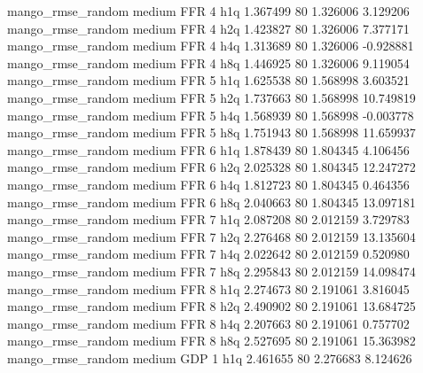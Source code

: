 mango_rmse_random     medium      FFR                 4                  h1q  1.367499 80       1.326006           3.129206
mango_rmse_random     medium      FFR                 4                  h2q  1.423827 80       1.326006           7.377171
mango_rmse_random     medium      FFR                 4                  h4q  1.313689 80       1.326006          -0.928881
mango_rmse_random     medium      FFR                 4                  h8q  1.446925 80       1.326006           9.119054
mango_rmse_random     medium      FFR                 5                  h1q  1.625538 80       1.568998           3.603521
mango_rmse_random     medium      FFR                 5                  h2q  1.737663 80       1.568998          10.749819
mango_rmse_random     medium      FFR                 5                  h4q  1.568939 80       1.568998          -0.003778
mango_rmse_random     medium      FFR                 5                  h8q  1.751943 80       1.568998          11.659937
mango_rmse_random     medium      FFR                 6                  h1q  1.878439 80       1.804345           4.106456
mango_rmse_random     medium      FFR                 6                  h2q  2.025328 80       1.804345          12.247272
mango_rmse_random     medium      FFR                 6                  h4q  1.812723 80       1.804345           0.464356
mango_rmse_random     medium      FFR                 6                  h8q  2.040663 80       1.804345          13.097181
mango_rmse_random     medium      FFR                 7                  h1q  2.087208 80       2.012159           3.729783
mango_rmse_random     medium      FFR                 7                  h2q  2.276468 80       2.012159          13.135604
mango_rmse_random     medium      FFR                 7                  h4q  2.022642 80       2.012159           0.520980
mango_rmse_random     medium      FFR                 7                  h8q  2.295843 80       2.012159          14.098474
mango_rmse_random     medium      FFR                 8                  h1q  2.274673 80       2.191061           3.816045
mango_rmse_random     medium      FFR                 8                  h2q  2.490902 80       2.191061          13.684725
mango_rmse_random     medium      FFR                 8                  h4q  2.207663 80       2.191061           0.757702
mango_rmse_random     medium      FFR                 8                  h8q  2.527695 80       2.191061          15.363982
mango_rmse_random     medium      GDP                 1                  h1q  2.461655 80       2.276683           8.124626
